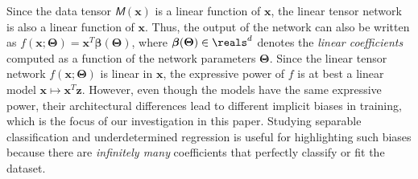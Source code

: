 \documentclass{article} %
\def\vw{{\bm{w}}}
\def\vx{{\bm{x}}}
\def\vz{{\bm{z}}}
\def\mW{{\bm{W}}}
\newcommand{\tens}[1]{\bm{\mathsfit{#1}}}
\def\tM{{\tens{M}}}
\newcommand{\vbeta}{{\bm{\beta}}}
\newcommand{\vbetafc}{\vbeta_{\rm fc}}
\newcommand{\vbetadiag}{\vbeta_{\rm diag}}
\newcommand{\vbetaconv}{\vbeta_{\rm conv}}
\newcommand{\bTheta}{\bm{\Theta}}
\newcommand{\bThetafc}{\bTheta_{\rm fc}}
\newcommand{\bThetadiag}{\bTheta_{\rm diag}}
\newcommand{\bThetaconv}{\bTheta_{\rm conv}}
\begin{document}
Since the data tensor $\tM(\vx)$ is a linear function of $\vx$, the linear tensor network is also a linear function of $\vx$. Thus, the output of the network can also be written as $f(\vx;\bTheta) = \vx^T \vbeta(\bTheta)$, where $\vbeta(\bTheta) \in \reals^d$ denotes the \emph{linear coefficients} computed as a function of the network parameters $\bTheta$. 
Since the linear tensor network $f(\vx;\bTheta)$ is linear in $\vx$, the expressive power of $f$ is at best a linear model $\vx \mapsto \vx^T \vz$. 
However, even though the models have the same expressive power, their architectural differences lead to different implicit biases in training, which is the focus of our investigation in this paper.
Studying separable classification and underdetermined regression is useful for highlighting such biases because there are \emph{infinitely many} coefficients that perfectly classify or fit the dataset.
\end{document}
